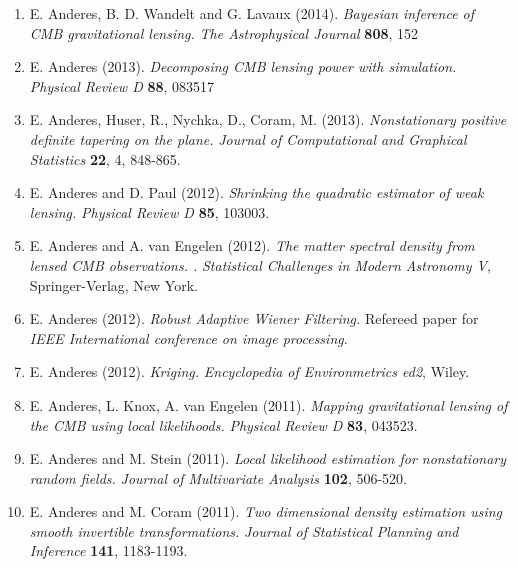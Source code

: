 \documentclass[11pt]{article}
\begin{document}
\begin{enumerate}[labelindent=0pt]


\item
E. Anderes, B. D. Wandelt and G. Lavaux (2014). \textsl{Bayesian inference of CMB gravitational lensing.} \textit{The Astrophysical Journal} {\bf 808}, 152




\item
E. Anderes (2013).
\textsl{Decomposing CMB lensing power with simulation.} \\
\textit{Physical Review D} {\bf 88}, 083517


\item
E. Anderes, Huser, R., Nychka, D., Coram, M. (2013). \textsl{Nonstationary positive definite tapering on the plane.}  \textit{Journal of Computational and Graphical Statistics} {\bf 22}, 4, 848-865.



\item
E. Anderes and D. Paul (2012).  \textsl{Shrinking the quadratic estimator of weak lensing.}
\textit{Physical Review D} {\bf 85}, 103003.



\item
E. Anderes and A. van Engelen (2012). \textsl{The matter spectral density from lensed CMB observations.
.} \textit{Statistical Challenges in Modern Astronomy V}, Springer-Verlag, New York.


\item
E. Anderes (2012).  \textsl{Robust Adaptive Wiener Filtering.}  Refereed paper for \textit{IEEE International conference on image processing}.


\item
E. Anderes (2012). \textsl{Kriging.}  \textit{Encyclopedia of Environmetrics ed2}, Wiley.




\item
E. Anderes, L. Knox, A. van Engelen (2011).  \textsl{Mapping gravitational lensing of the CMB using local likelihoods.}
\textit{Physical Review D} {\bf 83}, 043523.



\item
E. Anderes and M. Stein (2011).  \textsl{Local likelihood estimation for nonstationary random fields.}  \textit{Journal of Multivariate Analysis} {\bf 102}, 506-520.




\item
E. Anderes and M. Coram (2011).   \textsl{Two dimensional density estimation using smooth invertible transformations.}
 \textit{Journal of Statistical Planning and Inference} {\bf 141}, 1183-1193.




\end{enumerate}
\end{document}
